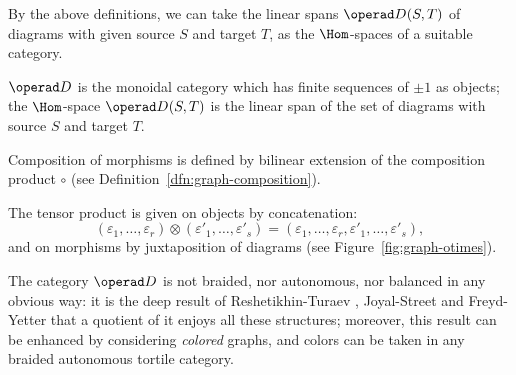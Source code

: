 By the above definitions, we can take the linear spans $\RTD(S,T)$ of
diagrams with given source $S$ and target $T$, as the $\Hom$-spaces of a
suitable category.
\begin{definition}
\label{dfn:diagrams-category}
$\RTD$ is the monoidal category which has finite sequences of $\pm1$ as
objects; the $\Hom$-space $\RTD(S,T)$ is the linear span of the set of
diagrams with source $S$ and target $T$.

Composition of morphisms is defined by bilinear extension of the
composition product $\circ$ (see Definition~\ref{dfn:graph-composition}).

The tensor product is given on objects by concatenation:
\begin{equation*}
  (\varepsilon_1, \ldots, \varepsilon_r) \otimes (\varepsilon'_1, \ldots, \varepsilon'_s) = (\varepsilon_1, \ldots, \varepsilon_r, \varepsilon'_1, \ldots, \varepsilon'_s),
\end{equation*}
and on morphisms by juxtaposition of diagrams (see
Figure~\ref{fig:graph-otimes}). 
\end{definition}

The category $\RTD$ is not braided, nor autonomous, nor balanced in
any obvious way: it is the deep result of Reshetikhin-Turaev
\cite{reshetikhin-turaev;ribbon-graphs}, Joyal-Street
\cite{joyal-street;tensor-calculus} and Freyd-Yetter
\cite{freyd-yetter;btc} that a quotient of it enjoys all these
structures; moreover, this result can be enhanced by considering
\emph{colored} graphs, and colors can be taken in any braided
autonomous tortile category.


